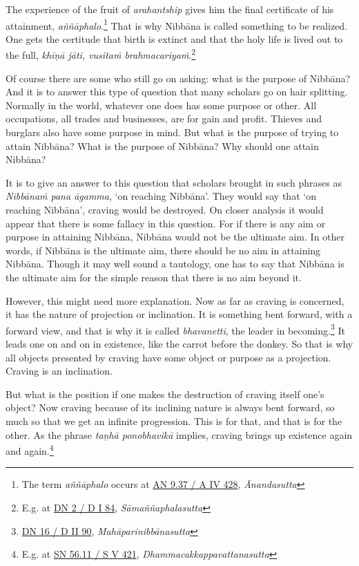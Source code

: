 The experience of the fruit of \emph{arahantship} gives him the final certificate of his attainment, \emph{aññāphalo}.\footnote{The term \emph{aññāphalo} occurs at \href{https://suttacentral.net/an9.37/pli/ms}{AN 9.37 / A IV 428}, \emph{Ānandasutta}} That is why Nibbāna is called something to be realized. One gets the certitude that birth is extinct and that the holy life is lived out to the full, \emph{khīṇā jāti, vusitaṁ brahmacariyaṁ}.\footnote{E.g. at \href{https://suttacentral.net/dn2/pli/ms}{DN 2 / D I 84}, \emph{Sāmaññaphalasutta}}

Of course there are some who still go on asking: what is the purpose of Nibbāna? And it is to answer this type of question that many scholars go on hair splitting. Normally in the world, whatever one does has some purpose or other. All occupations, all trades and businesses, are for gain and profit. Thieves and burglars also have some purpose in mind. But what is the purpose of trying to attain Nibbāna? What is the purpose of Nibbāna? Why should one attain Nibbāna?

It is to give an answer to this question that scholars brought in such phrases as \emph{Nibbānaṁ pana āgamma}, `on reaching Nibbāna'. They would say that `on reaching Nibbāna', craving would be destroyed. On closer analysis it would appear that there is some fallacy in this question. For if there is any aim or purpose in attaining Nibbāna, Nibbāna would not be the ultimate aim. In other words, if Nibbāna is the ultimate aim, there should be no aim in attaining Nibbāna. Though it may well sound a tautology, one has to say that Nibbāna is the ultimate aim for the simple reason that there is no aim beyond it.

However, this might need more explanation. Now as far as craving is concerned, it has the nature of projection or inclination. It is something bent forward, with a forward view, and that is why it is called \emph{bhavanetti}, the leader in becoming.\footnote{\href{https://suttacentral.net/dn16/pli/ms}{DN 16 / D II 90}, \emph{Mahāparinibbānasutta}} It leads one on and on in existence, like the carrot before the donkey. So that is why all objects presented by craving have some object or purpose as a projection. Craving is an inclination.

But what is the position if one makes the destruction of craving itself one's object? Now craving because of its inclining nature is always bent forward, so much so that we get an infinite progression. This is for that, and that is for the other. As the phrase \emph{taṇhā ponobhavikā} implies, craving brings up existence again and again.\footnote{E.g. at \href{https://suttacentral.net/sn56.11/pli/ms}{SN 56.11 / S V 421}, \emph{Dhammacakkappavattanasutta}}

